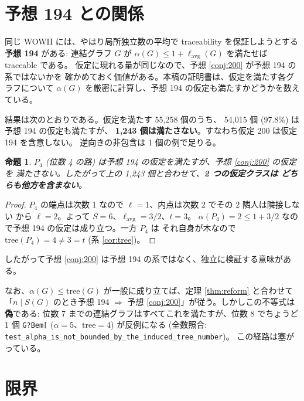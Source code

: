 \documentclass[paper=a4,fontsize=10.5pt,jafontsize=10.5pt]{jlreq}
\theoremstyle{plain}
\newtheorem{proposition}[theorem]{命題}
\theoremstyle{definition}
\begin{document}
\section{予想 194 との関係}\label{sec:194}

同じ WOWII には、やはり局所独立数の平均で traceability を保証しようとする
\textbf{予想 194} がある: 連結グラフ $G$ が
$\alpha(G) \le 1 + \ell_{\mathrm{avg}}(G)$ を満たせば traceable である。
仮定に現れる量が同じなので、予想 \ref{conj:200} が予想 194 の系ではないかを
確かめておく価値がある。本稿の証明書は、仮定を満たす各グラフについて
$\alpha(G)$ を厳密に計算し、予想 194 の仮定も満たすかどうかを数えている。

結果は次のとおりである。仮定を満たす 55,258 個のうち、
54,015 個 (97.8\%) は予想 194 の仮定も満たすが、
\textbf{1,243 個は満たさない}。すなわち仮定 200 は仮定 194 を含意しない。
逆向きの非包含は 1 個の例で足りる。

\begin{proposition}\label{prop:incomparable}
$P_4$ (位数 4 の路) は予想 194 の仮定を満たすが、予想 \ref{conj:200} の仮定を
満たさない。したがって上の 1,243 個と合わせて、\textbf{2 つの仮定クラスは
どちらも他方を含まない}。
\end{proposition}

\begin{proof}
$P_4$ の端点は次数 1 なので $\ell = 1$、内点は次数 2 でその 2 隣人は隣接しない
から $\ell = 2$。よって $S = 6$、$\ell_{\mathrm{avg}} = 3/2$、$t = 3$。
$\alpha(P_4) = 2 \le 1 + 3/2$ なので予想 194 の仮定は成り立つ。一方 $P_4$ は
それ自身が木なので $\mathrm{tree}(P_4) = 4 \ne 3 = t$ (系 \ref{cor:tree})。
\end{proof}

したがって予想 \ref{conj:200} は予想 194 の系ではなく、独立に検証する意味がある。

なお、$\alpha(G) \le \mathrm{tree}(G)$ が一般に成り立てば、定理
\ref{thm:reform} と合わせて「$n \mid S(G)$ のとき予想 194 $\Rightarrow$
予想 \ref{conj:200}」が従う。しかしこの不等式は\textbf{偽}である:
位数 7 までの連結グラフはすべてこれを満たすが、位数 8 でちょうど 1 個
\texttt{G?Bem[} ($\alpha = 5$、$\mathrm{tree} = 4$) が反例になる
(全数照合: \texttt{test\_alpha\_is\_not\_bounded\_by\_the\_induced\_tree\_number})。
この経路は塞がっている。

\section{限界}\label{sec:limit}
\end{document}
